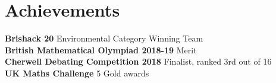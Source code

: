 \documentclass[a4paper,11pt]{article}
\begin{document}
\section{Achievements}
  \textbf{Brishack 20}{ Environmental Category Winning Team} \\
  \textbf{British Mathematical Olympiad 2018-19}{ Merit} \\
  \textbf{Cherwell Debating Competition 2018}{ Finalist, ranked 3rd out of 16} \\
  \textbf{UK Maths Challenge}{ 5 Gold  awards} \\
  
  
\end{document}
